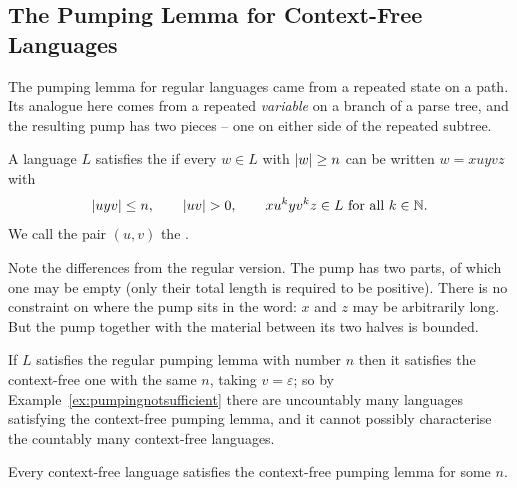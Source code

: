 \documentclass[a4paper]{scrartcl}
\newcommand{\eps}{\varepsilon}
\begin{document}
\subsection{The Pumping Lemma for Context-Free Languages}

The pumping lemma for regular languages came from a repeated state on a path. Its analogue here comes from a repeated \emph{variable} on a branch of a parse tree, and the resulting pump has two pieces -- one on either side of the repeated subtree.

\begin{definition}
	A language $L$ satisfies the  if every $w \in L$ with $\lvert w\rvert \geq n$ can be written $w = xuyvz$ with
	$$\lvert uyv\rvert \leq n, \qquad \lvert uv\rvert > 0, \qquad xu^kyv^kz \in L \text{ for all } k \in \mathbb{N}.$$
	We call the pair $(u,v)$ the .
\end{definition}

\begin{remark}
	Note the differences from the regular version. The pump has two parts, of which one may be empty (only their total length is required to be positive). There is no constraint on where the pump sits in the word: $x$ and $z$ may be arbitrarily long. But the pump together with the material between its two halves is bounded.

	If $L$ satisfies the regular pumping lemma with number $n$ then it satisfies the context-free one with the same $n$, taking $v = \eps$; so by Example~\ref{ex:pumpingnotsufficient} there are uncountably many languages satisfying the context-free pumping lemma, and it cannot possibly characterise the countably many context-free languages.
\end{remark}

\begin{theorem}\label{thm:cfpumping}
	Every context-free language satisfies the context-free pumping lemma for some $n$.
\end{theorem}
\end{document}
